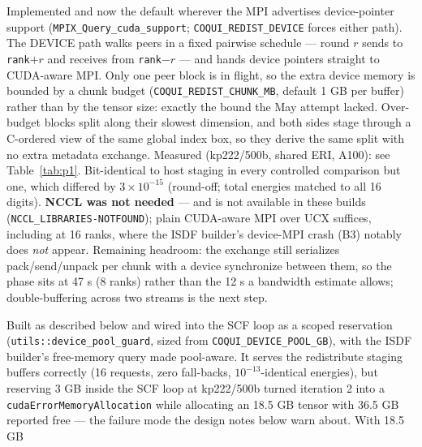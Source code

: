 \documentclass[11pt]{article}
\newcommand{\statusfixed}[1]{\textcolor{good}{\textbf{fixed} (\texttt{#1})}}
\begin{document}
\begin{description}[leftmargin=1.6em,style=nextline]
\item[P1 --- Device-direct chunked redistribute. \statusfixed{9860888,\,c2f8e71} \textcolor{good}{measured $-$64 s/iter at 8 ranks, $-$31 s/iter at 16.}]
Implemented and now the default wherever the MPI advertises device-pointer support
(\texttt{MPIX\_Query\_cuda\_support}; \texttt{COQUI\_REDIST\_DEVICE} forces either path).
The DEVICE path walks peers in a fixed pairwise schedule --- round $r$ sends to
\texttt{rank}$+r$ and receives from \texttt{rank}$-r$ --- and hands device pointers
straight to CUDA-aware MPI. Only one peer block is in flight, so the extra device memory
is bounded by a chunk budget (\texttt{COQUI\_REDIST\_CHUNK\_MB}, default 1 GB per buffer)
rather than by the tensor size: exactly the bound the May attempt lacked. Over-budget
blocks split along their slowest dimension, and both sides stage through a C-ordered view
of the same global index box, so they derive the same split with no extra metadata
exchange. Measured (kp222/500b, shared ERI, A100): see
Table~\ref{tab:p1}. Bit-identical to host staging in every controlled comparison but
one, which differed by $3\times10^{-15}$ (round-off; total energies matched to all 16
digits). \textbf{NCCL was not needed} --- and is not available in these builds
(\texttt{NCCL\_LIBRARIES-NOTFOUND}); plain CUDA-aware MPI over UCX suffices, including at
16 ranks, where the ISDF builder's device-MPI crash (B3) notably does \emph{not} appear.
Remaining headroom: the exchange still serializes pack/send/unpack per chunk with a device
synchronize between them, so the phase sits at 47 s (8 ranks) rather than the 12 s a
bandwidth estimate allows; double-buffering across two streams is the next step.
\item[P2 --- Activate nda's existing pooled allocator. \textcolor{cpuc}{\textbf{built, opt-in, not usable at this scale}} (\texttt{ae0486f}, \texttt{975c912}, \texttt{9860888}).]
Built as described below and wired into the SCF loop as a scoped reservation
(\texttt{utils::device\_pool\_guard}, sized from \texttt{COQUI\_DEVICE\_POOL\_GB}), with
the ISDF builder's free-memory query made pool-aware. It serves the redistribute staging
buffers correctly (16 requests, zero fall-backs, $10^{-13}$-identical energies), but
reserving 3 GB inside the SCF loop at kp222/500b turned iteration 2 into a
\texttt{cudaErrorMemoryAllocation} while allocating an 18.5 GB tensor with 36.5 GB
reported free --- the failure mode the design notes below warn about. With 18.5 GB

\end{description}
\end{document}
